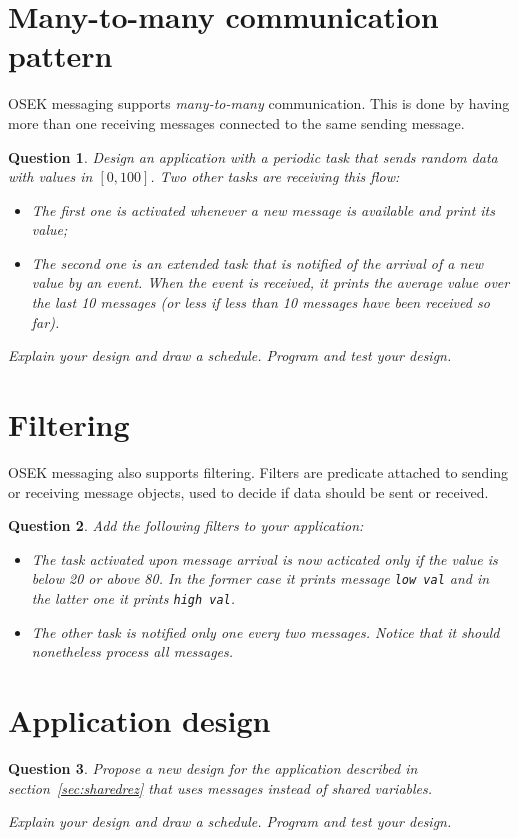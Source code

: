\documentclass[11pt]{report}
\newtheorem{ex}{Question}
\begin{document}
\section{Many-to-many communication pattern}

OSEK messaging supports \emph{many-to-many} communication.
This is done by having more than one receiving messages connected to the same sending message.

\begin{ex}
  Design an application with a periodic task that sends random data with values in $[0,100]$.
  Two other tasks are receiving this flow:
  \begin{itemize}
    \item
      The first one is activated whenever a new message is available and print its value;
    \item
      The second one is an extended task that is notified of the arrival of a new value by an event.
      When the event is received, it prints the average value over the last 10 messages (or less if less than 10 messages have been received so far).
  \end{itemize}

  Explain your design and draw a schedule. Program and test your design.
\end{ex}

\section{Filtering}

OSEK messaging also supports filtering.
Filters are predicate attached to sending or receiving message objects, used to decide if data should be sent or received.

\begin{ex}
  Add the following filters to your application:
  \begin{itemize}
    \item
      The task activated upon message arrival is now acticated only if the value is below \num{20} or above \num{80}.
      In the former case it prints message \verb-low val- and in the latter one it prints \verb-high val-.
    \item
      The other task is notified only one every two messages.
      Notice that it should nonetheless process all messages.
  \end{itemize}
\end{ex}

\section{Application design}

\begin{ex}
  Propose a new design for the application described in section~\ref{sec:sharedrez} that uses messages instead of shared variables.

  Explain your design and draw a schedule. Program and test your design.
\end{ex}
\end{document}
